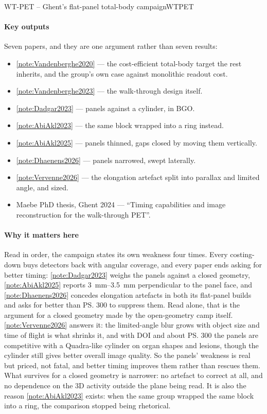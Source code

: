 \begin{programnote}{WT-PET -- Ghent's flat-panel total-body campaign}{WTPET}
\paragraph{Key outputs}
Seven papers, and they are one argument rather than seven results:
\begin{itemize}
	\item \ref{note:Vandenberghe2020} --- the cost-efficient total-body target the
		rest inherits, and the group's own case against monolithic readout cost.
	\item \ref{note:Vandenberghe2023} --- the walk-through design itself.
	\item \ref{note:Dadgar2023} --- panels against a cylinder, in BGO.
	\item \ref{note:AbiAkl2023} --- the same block wrapped into a ring instead.
	\item \ref{note:AbiAkl2025} --- panels thinned, gaps closed by moving them
		vertically.
	\item \ref{note:Dhaenens2026} --- panels narrowed, swept laterally.
	\item \ref{note:Vervenne2026} --- the elongation artefact split into
		parallax and limited angle, and sized.
	\item Maebe PhD thesis, Ghent 2024 --- ``Timing capabilities and image
		reconstruction for the walk-through PET''.
\end{itemize}

\paragraph{Why it matters here}
Read in order, the campaign states its own weakness four times. Every
costing-down buys detectors back with angular coverage, and every paper ends
asking for better timing: \ref{note:Dadgar2023} weighs the panels against a
closed geometry, \ref{note:AbiAkl2025} reports
\qtyrange{3}{3.5}{\mm} perpendicular to the panel face, and
\ref{note:Dhaenens2026} concedes elongation artefacts in both its flat-panel
builds and asks for better than \ps{300} to suppress them. Read alone, that is
the argument for a closed geometry made by the open-geometry camp itself.
\ref{note:Vervenne2026} answers it: the limited-angle blur grows with object
size and time of flight is what shrinks it, and with  DOI and about
\ps{300} the panels are competitive with a Quadra-like cylinder on organ shapes
and lesions, though the cylinder still gives better overall image quality. So the panels' weakness
is real but priced, not fatal, and better timing improves them rather than
rescues them. What survives for a closed geometry is narrower: no artefact to
correct at all, and no dependence on the 3D activity outside the plane being
read. It is also the reason \ref{note:AbiAkl2023} exists: when the same group
wrapped the same block into a ring, the comparison stopped being rhetorical.


\end{programnote}
